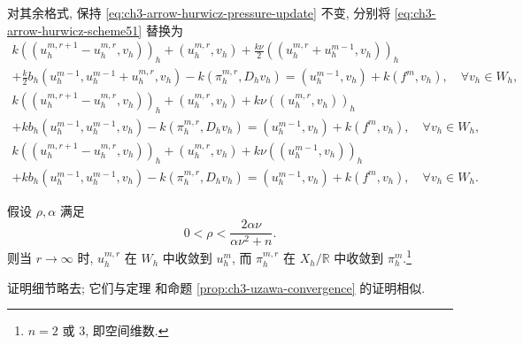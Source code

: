 对其余格式, 保持 \eqref{eq:ch3-arrow-hurwicz-pressure-update} 不变, 分别将 \eqref{eq:ch3-arrow-hurwicz-scheme51} 替换为
\begin{equation}
\begin{split}
k((u_h^{m,r+1}-u_h^{m,r},v_h))_h+(u_h^{m,r},v_h)
+\frac{k\nu}{2}((u_h^{m,r}+u_h^{m-1},v_h))_h\\
+\frac k2b_h(u_h^{m-1},u_h^{m-1}+u_h^{m,r},v_h)-k(\pi_h^{m,r},D_hv_h)
=(u_h^{m-1},v_h)+k(f^m,v_h),\quad\forall v_h\in W_h,
\end{split}
\label{eq:ch3-arrow-hurwicz-scheme52}
\end{equation}
\begin{equation}
\begin{split}
k((u_h^{m,r+1}-u_h^{m,r},v_h))_h+(u_h^{m,r},v_h)
+k\nu((u_h^{m,r},v_h))_h\\
+kb_h(u_h^{m-1},u_h^{m-1},v_h)-k(\pi_h^{m,r},D_hv_h)
=(u_h^{m-1},v_h)+k(f^m,v_h),\quad\forall v_h\in W_h,
\end{split}
\label{eq:ch3-arrow-hurwicz-scheme53}
\end{equation}
\begin{equation}
\begin{split}
k((u_h^{m,r+1}-u_h^{m,r},v_h))_h+(u_h^{m,r},v_h)
+k\nu((u_h^{m-1},v_h))_h\\
+kb_h(u_h^{m-1},u_h^{m-1},v_h)-k(\pi_h^{m,r},D_hv_h)
=(u_h^{m-1},v_h)+k(f^m,v_h),\quad\forall v_h\in W_h.
\end{split}
\label{eq:ch3-arrow-hurwicz-scheme54}
\end{equation}

\begin{Proposition}
\label{prop:ch3-arrow-hurwicz-convergence}
假设 $\rho,\alpha$ 满足
\begin{equation}
0<\rho<\frac{2\alpha\nu}{\alpha\nu^2+n}.
\label{eq:ch3-arrow-hurwicz-condition}
\end{equation}
则当 $r\to\infty$ 时, $u_h^{m,r}$ 在 $W_h$ 中收敛到 $u_h^m$, 而 $\pi_h^{m,r}$ 在 $X_h/\mathbb R$ 中收敛到 $\pi_h^m$.\footnote{$n=2$ 或 $3$, 即空间维数.}
\end{Proposition}

\begin{Proof}
证明细节略去; 它们与定理  和命题 \ref{prop:ch3-uzawa-convergence} 的证明相似.
\end{Proof}
